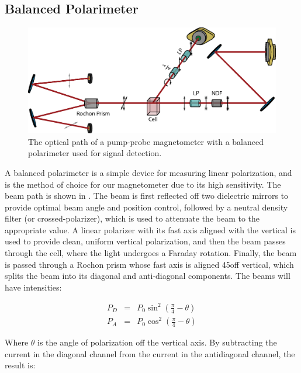 \documentclass[PaulGanssle-Thesis.tex]{subfiles}
\begin{document}
\subsection{Balanced Polarimeter}
\label{mag.design.balanced.polarimeter}
\begin{figure}[ht!]
\centering
\includegraphics[width=0.9\tw]{figures/magnetometer/BalancedPolarimeter.eps}
\caption{The optical path of a pump-probe magnetometer with a balanced polarimeter used for signal detection.}
\label{fig:BalancedPolarimeterOpticalPath}
\end{figure}
A balanced polarimeter is a simple device for measuring linear polarization, and is the method of choice for our magnetometer due to its high sensitivity. The beam path is shown in . The beam is first reflected off two dielectric mirrors to provide optimal beam angle and position control, followed by a neutral density filter (or crossed-polarizer), which is used to attenuate the beam to the appropriate value. A linear polarizer with its fast axis aligned with the vertical is used to provide clean, uniform vertical polarization, and then the beam passes through the cell, where the light undergoes a Faraday rotation. Finally, the beam is passed through a Rochon prism whose fast axis is aligned 45\degsym  off vertical, which splits the beam into its diagonal and anti-diagonal components. The beams will have intensities:\citep{Seltzer2008} %

\begin{eqnarray}
P_D & = & P_{0}\sin^2\left(\frac{\pi}{4} - \theta\right) \\
P_A & = & P_{0}\cos^2\left(\frac{\pi}{4} - \theta\right) 
\end{eqnarray}

Where $\theta$ is the angle of polarization off the vertical axis. By subtracting the current in the diagonal channel from the current in the antidiagonal channel, the result is:
\end{document}
